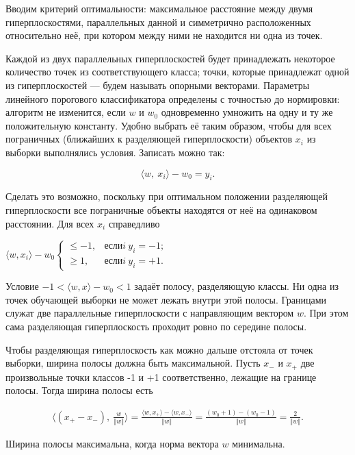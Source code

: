 \documentclass[12pt]{article}
\begin{document}
	Вводим критерий оптимальности: максимальное расстояние между двумя гиперплоскостями, параллельных данной и симметрично расположенных относительно неё, при котором между ними не находится ни одна из точек.	
	
	Каждой из двух параллельных гиперплоскостей будет принадлежать некоторое количество точек из соответствующего класса; точки, которые принадлежат одной из гиперплоскостей — будем называть опорными векторами.
	Параметры линейного порогового классификатора определены с точностью до нормировки: алгоритм не изменится, если $w$ и $w_0$ одновременно умножить на одну и ту же положительную константу.  Удобно выбрать её таким образом, чтобы для всех пограничных (ближайших к разделяющей гиперплоскости) объектов $x_i$ из выборки выполнялись условия. Записать можно так:
	
	
	
	$$
	\langle w,\ x_{i}\rangle-w_{0}=y_{i}.
	$$
	
	Сделать это возможно, поскольку при оптимальном положении разделяющей гиперплоскости все пограничные объекты находятся от неё на одинаковом расстоянии. Для всех $x_i$ справедливо
	
	\begin{center}
	$\langle w, x_{i}\rangle-w_{0}\left\{\begin{array}{ll}
	\leq-1, & если i\ y_{i}=-1;\\
	\geq 1, & если i\ y_{i}=+1.
	\end{array}\right.$
	\end{center}
		
	Условие $-1<\langle w, x\rangle-w_{0}<1$ задаёт полосу, разделяющую классы. Ни одна из точек обучающей выборки не может лежать внутри этой полосы. Границами служат две параллельные гиперплоскости с направляющим вектором $w$. При этом сама разделяющая гиперплоскость проходит ровно по середине полосы.
	
	Чтобы разделяющая гиперплоскость как можно дальше отстояла от точек выборки, ширина полосы должна быть максимальной. Пусть $x_-$ и $x_+$ две произвольные точки классов -1 и +1 соответственно, лежащие	на границе полосы. Тогда ширина полосы есть
	
	\begin{align*}
		\langle(x_{+}-x_{-}),\ \frac{w}{\Vert w\Vert}\rangle=\frac{\langle w,x_{+}\rangle-\langle w,x_{-}\rangle}{\Vert w\Vert}=\frac{(w_{0}+1)-(w_{0}-1)}{\Vert w\Vert}=\frac{2}{\Vert w\Vert}.
	\end{align*}
	
	Ширина полосы максимальна, когда норма вектора $w$ минимальна.
	
\end{document}
